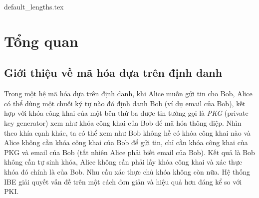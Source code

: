 \documentclass[class=report, crop=false]{standalone}
\begin{document}
	{default_lengths.tex}
	\baselineskip
	\chapter{Tổng quan}\label{chap:2}
	\section{Giới thiệu về mã hóa dựa trên định danh}
		Trong một hệ mã hóa dựa trên định danh, khi Alice muốn gửi tin cho Bob, Alice có thể dùng một chuỗi ký tự nào đó định danh Bob (ví dụ email của Bob), kết hợp với khóa công khai của một bên thứ ba được tin tưởng gọi là \textit{PKG} (private key generator) xem như khóa công khai của Bob để mã hóa thông điệp. Nhìn theo khía cạnh khác, ta có thể xem như Bob không hề có khóa công khai nào và Alice không cần khóa công khai của Bob để gửi tin, chỉ cần khóa công khai của PKG và email của Bob (tất nhiên Alice phải biết email của Bob). Kết quả là Bob không cần tự sinh khóa, Alice không cần phải lấy khóa công khai và xác thực khóa đó chính là của Bob. Nhu cầu xác thực chủ khóa không còn nữa. Hệ thống IBE giải quyết vấn đề trên một cách đơn giản và hiệu quả hơn đáng kể so với PKI.
\end{document}
